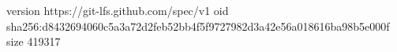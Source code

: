 version https://git-lfs.github.com/spec/v1
oid sha256:d8432694060c5a3a72d2feb52bb4f5f9727982d3a42e56a018616ba98b5e000f
size 419317
